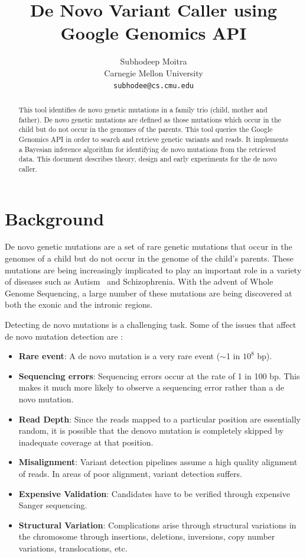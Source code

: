 \documentclass{article}
\begin{document}
\title{De Novo Variant Caller using Google Genomics API}

\author{
	Subhodeep Moitra\\
	Carnegie Mellon University \\
	{\tt subhodee@cs.cmu.edu}
}

\maketitle

\begin{abstract}
This tool identifies de novo genetic mutations in a family trio (child, mother and father). De novo genetic mutations are defined as those mutations which occur in the child but do not occur in the genomes of the parents. This tool queries the Google Genomics API in order to search and retrieve genetic variants and reads. It implements a Bayesian inference algorithm for identifying  de novo mutations from the retrieved data. This document describes theory, design and early experiments for the de novo caller.
\end{abstract}

\section{Background}
De novo genetic mutations are a set of rare genetic mutations that occur in the genomes of a child but do not occur in the genome of the child's parents. These mutations are being increasingly implicated to play an important role in a variety of diseases such as Autism~\cite{Michaelson2012} and Schizophrenia. With the advent of Whole Genome Sequencing, a large number of these mutations are being discovered at both the exonic and the intronic regions.

\vspace{1em}
Detecting de novo mutations is a challenging task. Some of the issues that affect de novo mutation detection are :
\begin{itemize}
\item \textbf{Rare event}: A de novo mutation is a very rare event ($\sim$1 in $10^8$ bp).
\item \textbf{Sequencing errors}: Sequencing errors occur at the rate of 1 in 100 bp. This makes it much more likely to observe a sequencing error rather than a de novo mutation.
\item \textbf{Read Depth}: Since the reads mapped to a particular position are essentially random, it is possible that the denovo mutation is completely skipped by inadequate coverage at that position.
\item \textbf{Misalignment}: Variant detection pipelines assume a high quality alignment of reads. In areas of poor alignment, variant detection suffers.
\item \textbf{Expensive Validation}: Candidates have to be verified through expensive Sanger sequencing.
\item \textbf{Structural Variation}: Complications arise through structural variations in the chromosome through insertions, deletions, inversions, copy number variations, translocations, etc.
\end{itemize}
\end{document}
